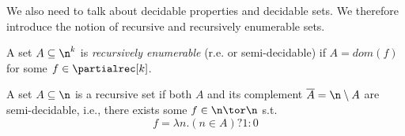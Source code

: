 We also need to talk about decidable properties and decidable sets. We
therefore introduce the notion of recursive and recursively enumerable
sets.

\begin{definition}
  A set \(A \subseteq \n^k\) is \emph{recursively enumerable} (r.e. or
  semi-decidable) if \(A = dom(f)\) for some \(f \in \partialrec[k]\).
  
  A set \(A\subseteq \n\) is a recursive set if both \(A\) and its
  complement \(\overline{A} = \n \setminus A\) are semi-decidable,
  i.e., there exists some \(f \in \n \tor \n\) s.t.
  \[f = \lambda n . (n \in A) ? 1 : 0\]
\end{definition}




